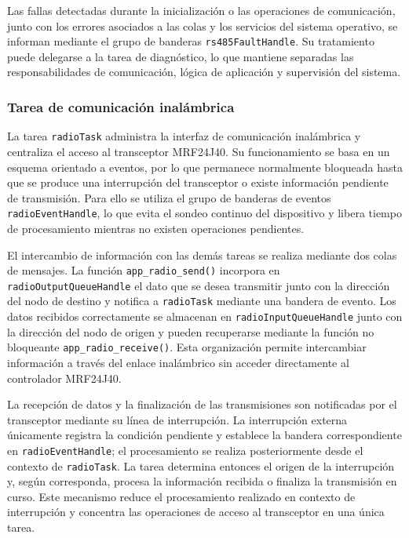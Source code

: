 Las fallas detectadas durante la inicialización o las operaciones de comunicación, junto con los errores asociados a las colas y los servicios del sistema operativo, se informan mediante el grupo de banderas \texttt{rs485FaultHandle}. Su tratamiento puede delegarse a la tarea de diagnóstico, lo que mantiene separadas las responsabilidades de comunicación, lógica de aplicación y supervisión del sistema.


\subsubsection{Tarea de comunicación inalámbrica}

La tarea \texttt{radioTask} administra la interfaz de comunicación inalámbrica y centraliza el acceso al transceptor MRF24J40. Su funcionamiento se basa en un esquema orientado a eventos, por lo que permanece normalmente bloqueada hasta que se produce una interrupción del transceptor o existe información pendiente de transmisión. Para ello se utiliza el grupo de banderas de eventos \texttt{radioEvent\-Handle}, lo que evita el sondeo continuo del dispositivo y libera tiempo de procesamiento mientras no existen operaciones pendientes.

El intercambio de información con las demás tareas se realiza mediante dos colas de mensajes. La función \texttt{app\_radio\_send()} incorpora en \texttt{radioOutput\-QueueHandle} el dato que se desea transmitir junto con la dirección del nodo de destino y notifica a \texttt{radioTask} mediante una bandera de evento. Los datos recibidos correctamente se almacenan en \texttt{radioInputQueueHandle} junto con la dirección del nodo de origen y pueden recuperarse mediante la función no bloqueante \texttt{app\_radio\_receive()}. Esta organización permite intercambiar información a través del enlace inalámbrico sin acceder directamente al controlador MRF24J40.

La recepción de datos y la finalización de las transmisiones son notificadas por el transceptor mediante su línea de interrupción. La interrupción externa únicamente registra la condición pendiente y establece la bandera correspondiente en \texttt{radioEventHandle}; el procesamiento se realiza posteriormente desde el contexto de \texttt{radioTask}. La tarea determina entonces el origen de la interrupción y, según corresponda, procesa la información recibida o finaliza la transmisión en curso. Este mecanismo reduce el procesamiento realizado en contexto de interrupción y concentra las operaciones de acceso al transceptor en una única tarea.

